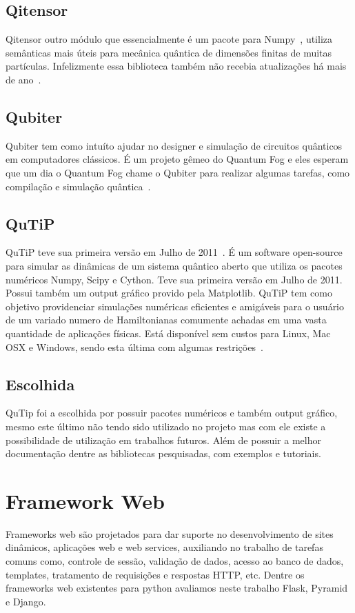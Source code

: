 \documentclass[a4paper, 12pt, oneside]{book}
\begin{document}
\subsection{Qitensor}
Qitensor outro módulo que essencialmente é um pacote para Numpy~\cite{numpy}, utiliza semânticas mais úteis para mecânica quântica de dimensões finitas de muitas partículas. Infelizmente essa biblioteca também não recebia atualizações há mais de ano~\cite{qitensor}.
\subsection{Qubiter}
Qubiter tem como intuíto ajudar no designer e simulação de circuitos quânticos em computadores clássicos. É um projeto gêmeo do Quantum Fog e eles esperam que um dia o Quantum Fog chame o Qubiter para realizar algumas tarefas, como compilação e simulação quântica~\cite{qubiter}.	

\subsection{QuTiP}
QuTiP teve sua primeira versão em Julho de 2011~\cite{qutipchangelog}. É um software open-source para simular as dinâmicas de um sistema quântico aberto que utiliza os pacotes numéricos Numpy, Scipy e Cython. Teve sua primeira versão em Julho de 2011. Possui também um output gráfico provido pela Matplotlib. QuTiP tem como objetivo providenciar simulações numéricas eficientes e amigáveis para o usuário de um variado numero de Hamiltonianas comumente achadas em uma vasta quantidade de aplicações físicas. Está disponível sem custos para Linux, Mac OSX e Windows, sendo esta última com algumas restrições~\cite{qutip.org}. \cite{teste}

\subsection{Escolhida}
QuTip foi a escolhida por possuir pacotes numéricos e também output gráfico, mesmo este último não tendo sido utilizado no projeto mas com ele existe a possibilidade de utilização em trabalhos futuros. Além de possuir a melhor documentação dentre as bibliotecas pesquisadas, com exemplos e tutoriais.

\section{Framework Web}
Frameworks web são projetados para dar suporte no desenvolvimento de sites dinâmicos, aplicações web e web services, auxiliando no trabalho de tarefas comuns como, controle de sessão, validação de dados, acesso ao banco de dados, templates, tratamento de requisições e respostas HTTP, etc. Dentre os frameworks web existentes para python avaliamos neste trabalho Flask, Pyramid e Django.
\end{document}
